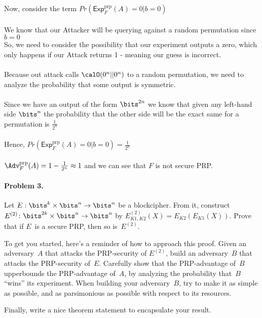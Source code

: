 \documentclass[11pt]{article}
\newcommand{\ExpPRP}[2]{\mathsf{Exp}^{\mathrm{prp}}_{#1}{(#2)}}
\newcommand{\AdvPRP}[2]{\Adv^{\mathrm{prp}}_{#1}(#2)}
\begin{document}
Now, consider the term $Pr(\ExpPRP{F}{A} = 0 | b = 0)$\\
\\
We know that our Attacker will be querying against a random permutation since $b = 0$
\\

So, we need to consider the possibility that our experiment outputs a zero, which only happens if our Attack returns 1 - meaning our guess is incorrect. \\
\\
Because out attack calls $\calO(0^n || 0^n)$ to a random permutation, we need to analyze the probability that some output is symmetric.\\
\\
Since we have an output of the form $\bits^{2n}$ we know that given any left-hand side $\bits^{n}$ the probability that the other side will be the exact same for a permutation is $\frac{1}{2^n}$\\
\\
Hence, $Pr(\ExpPRP{F}{A} = 0 | b = 0) = \frac{1}{2^n}$\\
\\
$\AdvPRP{F}{A} = 1 - \frac{1}{2^n} \approx 1$ and we can see that $F$ is not secure PRP.



\paragraph{Problem 3.}
Let $E:\bits^k \times \bits^n \to \bits^n$ be a blockcipher.  From it,
construct $E^{(2)}\colon \bits^{2k} \times \bits^n \to \bits^n$ by
$E^{(2)}_{K1,K2}(X) = E_{K2}(E_{K1}(X))$. Prove that if $E$~is a
secure PRP, then so is~$E^{(2)}$.  

To get you started, here's a reminder of how to approach this
proof. Given an adversary~$A$ that attacks the PRP-security of
$E^{(2)}$, build an adversary~$B$ that attacks the PRP-security
of~$E$.  Carefully show that the PRP-advantage of~$B$ upperbounds the
PRP-advantage of~$A$, by analyzing the probability that~$B$ ``wins''
its experiment.  When building your adversary~$B$, try to make it as
simple as possible, and as parsimonious as possible with respect to
its resources.  

Finally, write a nice theorem statement to encapsulate
your result. 
\end{document}
